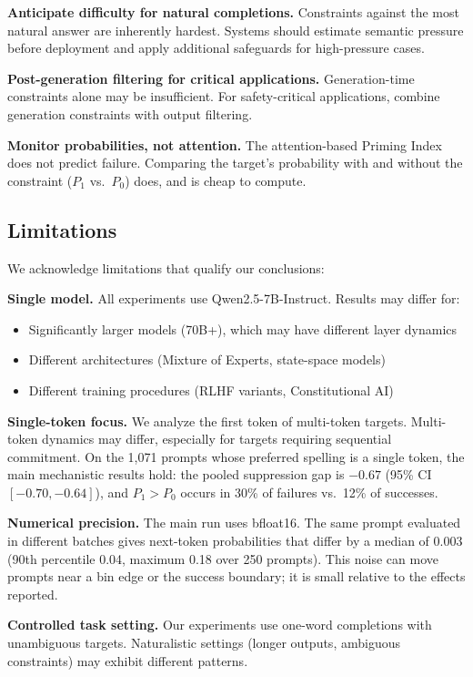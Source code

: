 \documentclass{article}
\begin{document}
\textbf{Anticipate difficulty for natural completions.} Constraints against the most natural answer are inherently hardest. Systems should estimate semantic pressure before deployment and apply additional safeguards for high-pressure cases.

\textbf{Post-generation filtering for critical applications.} Generation-time constraints alone may be insufficient. For safety-critical applications, combine generation constraints with output filtering.

\textbf{Monitor probabilities, not attention.} The attention-based Priming Index does not predict failure. Comparing the target's probability with and without the constraint ($P_1$ vs.\ $P_0$) does, and is cheap to compute.

\subsection{Limitations}

We acknowledge limitations that qualify our conclusions:

\textbf{Single model.} All experiments use Qwen2.5-7B-Instruct. Results may differ for:
\begin{itemize}
    \item Significantly larger models (70B+), which may have different layer dynamics
    \item Different architectures (Mixture of Experts, state-space models)
    \item Different training procedures (RLHF variants, Constitutional AI)
\end{itemize}

\textbf{Single-token focus.} We analyze the first token of multi-token targets. Multi-token dynamics may differ, especially for targets requiring sequential commitment. On the 1,071 prompts whose preferred spelling is a single token, the main mechanistic results hold: the pooled suppression gap is $-0.67$ (95\% CI $[-0.70, -0.64]$), and $P_1 > P_0$ occurs in 30\% of failures vs.\ 12\% of successes.

\textbf{Numerical precision.} The main run uses bfloat16. The same prompt evaluated in different batches gives next-token probabilities that differ by a median of 0.003 (90th percentile 0.04, maximum 0.18 over 250 prompts). This noise can move prompts near a bin edge or the success boundary; it is small relative to the effects reported.

\textbf{Controlled task setting.} Our experiments use one-word completions with unambiguous targets. Naturalistic settings (longer outputs, ambiguous constraints) may exhibit different patterns.
\end{document}
